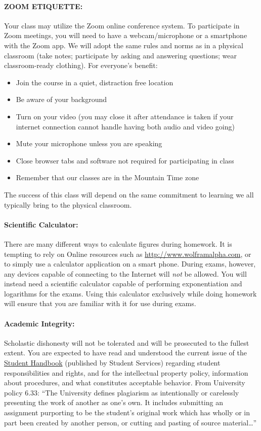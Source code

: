 \documentclass[12pt, letterpaper]{article}
\begin{document}
\paragraph{ZOOM ETIQUETTE:}
Your class may utilize the Zoom online conference system. To participate in Zoom meetings, you will need to have a webcam/microphone or a smartphone with the Zoom app. We will adopt the same rules and norms as in a physical classroom (take notes; participate by asking and answering questions; wear classroom-ready clothing). For everyone’s benefit:
\begin{itemize}
	\item Join the course in a quiet, distraction free location
	\item Be aware of your background
	\item Turn on your video (you may close it after attendance is taken if your internet connection cannot handle having both audio and video going)
	\item Mute your microphone unless you are speaking
	\item Close browser tabs and software not required for participating in class
	\item Remember that our classes are in the Mountain Time zone
\end{itemize}
The success of this class will depend on the same commitment to learning we all typically bring to the physical classroom.

\paragraph{Scientific Calculator:}
There are many different ways to calculate figures during homework. It is tempting to rely on Online resources such as \href{http://www.wolframalpha.com}{http://www.wolframalpha.com}, or to simply use a calculator application on a smart phone. During exams, however, any devices capable of connecting to the Internet will \emph{not} be allowed. You will instead need a scientific calculator capable of performing exponentiation and logarithms for the exams. Using this calculator exclusively while doing homework will ensure that you are familiar with it for use during exams.

\paragraph{Academic Integrity:}
Scholastic dishonesty will not be tolerated and will be prosecuted to the fullest extent. You are expected to have read and understood the current issue of the \href{https://help.suu.edu/handbook}{Student Handbook} (published by Student Services) regarding student responsibilities and rights, and for the intellectual property policy, information about procedures, and what constitutes acceptable behavior. From University policy 6.33: ``The University defines plagiarism as intentionally or carelessly presenting the work of another as one’s own. It includes submitting an assignment purporting to be the student’s original work which has wholly or in part been created by another person, or cutting and pasting of source material\ldots''
\end{document}
